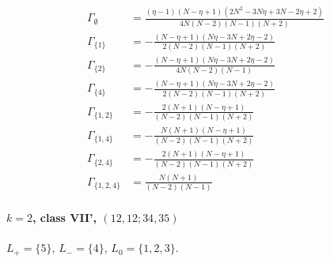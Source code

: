 \documentclass[11pt]{article}
\begin{document}
\begin{align*}
  \Gamma_{\emptyset} &= \frac{\left(\eta - 1\right) \left(N - \eta + 1\right) \left(2 N^{2} - 3 N \eta + 3 N - 2 \eta + 2\right)}{4 N \left(N - 2\right) \left(N - 1\right) \left(N + 2\right)} \\
  \Gamma_{\{1\}} &= - \frac{\left(N - \eta + 1\right) \left(N \eta - 3 N + 2 \eta - 2\right)}{2 \left(N - 2\right) \left(N - 1\right) \left(N + 2\right)} \\
  \Gamma_{\{2\}} &= - \frac{\left(N - \eta + 1\right) \left(N \eta - 3 N + 2 \eta - 2\right)}{4 N \left(N - 2\right) \left(N - 1\right)} \\
  \Gamma_{\{4\}} &= - \frac{\left(N - \eta + 1\right) \left(N \eta - 3 N + 2 \eta - 2\right)}{2 \left(N - 2\right) \left(N - 1\right) \left(N + 2\right)} \\
  \Gamma_{\{1,2\}} &= - \frac{2 \left(N + 1\right) \left(N - \eta + 1\right)}{\left(N - 2\right) \left(N - 1\right) \left(N + 2\right)} \\
  \Gamma_{\{1,4\}} &= - \frac{N \left(N + 1\right) \left(N - \eta + 1\right)}{\left(N - 2\right) \left(N - 1\right) \left(N + 2\right)} \\
  \Gamma_{\{2,4\}} &= - \frac{2 \left(N + 1\right) \left(N - \eta + 1\right)}{\left(N - 2\right) \left(N - 1\right) \left(N + 2\right)} \\
  \Gamma_{\{1,2,4\}} &= \frac{N \left(N + 1\right)}{\left(N - 2\right) \left(N - 1\right)} 
\end{align*}

\paragraph{$k=2$, class VII', $(12,12;34,35)$}

$L_+=\{5\}$, $L_-=\{4\}$, $L_0=\{1,2,3\}$.
\end{document}
